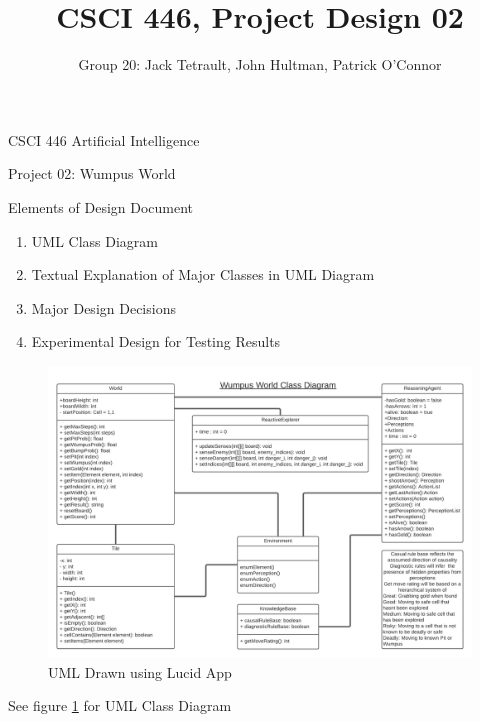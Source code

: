 \documentclass{article}
\title{CSCI 446, Project Design 02}
\author{Group 20: Jack Tetrault, John Hultman, Patrick O'Connor}
\begin{document}
\maketitle

CSCI 446 Artificial Intelligence

Project 02: Wumpus World

Elements of Design Document
\begin{enumerate}
    \item UML Class Diagram
    \item Textual Explanation of Major Classes in UML Diagram
    \item Major Design Decisions
    \item Experimental Design for Testing Results
\end{enumerate}




\begin{figure}
    \includegraphics[width=\textwidth]{WumpusUMLDiagram.png}
    \caption{UML Drawn using Lucid App}
    \label{fig:num01}
\end{figure}
See figure \ref{fig:num01} for UML Class Diagram

\end{document}
